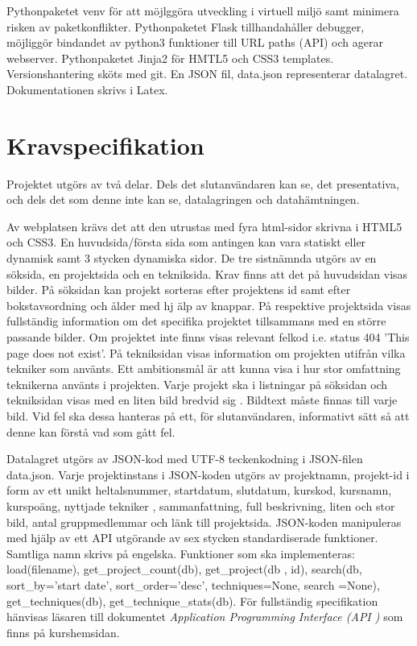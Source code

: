 \documentclass{TDP003mall}
\begin{document}
Pythonpaketet venv för att möjlggöra utveckling i virtuell miljö samt minimera risken av paketkonflikter.
Pythonpaketet Flask tillhandahåller debugger, möjliggör bindandet av python3 funktioner till URL paths (API) och agerar webserver.
Pythonpaketet Jinja2 för HMTL5 och CSS3 templates.
Versionshantering sköts med git.
En JSON fil, data.json representerar datalagret.
Dokumentationen skrivs i Latex.

\newpage

\section{Kravspecifikation}
Projektet utgörs av två delar. Dels det slutanvändaren kan se, det presentativa,
och dels det som denne inte kan se, datalagringen och datahämtningen.

Av webplatsen krävs det att den utrustas med fyra html-sidor skrivna i HTML5 och
 CSS3. En huvudsida/första sida som antingen kan vara statiskt eller dynamisk samt
 3 stycken dynamiska sidor. De tre sistnämnda utgörs av en söksida, en projektsida
 och en tekniksida. Krav finns att det på huvudsidan visas bilder. På söksidan kan
 projekt sorteras efter projektens id samt efter bokstavsordning och ålder med hj
älp av knappar. På respektive projektsida visas fullständig information om det specifika
 projektet tillsammans med en större passande bilder. Om projektet inte finns visas
 relevant felkod i.e. status 404 'This page does not exist'. På tekniksidan visas
 information om projekten utifrån vilka tekniker som använts. Ett ambitionsmål är
 att kunna visa i hur stor omfattning teknikerna använts i projekten. Varje projekt
 ska i listningar på söksidan och tekniksidan visas med en liten bild bredvid sig
. Bildtext måste finnas till varje bild. Vid fel ska dessa hanteras på ett, för 
slutanvändaren, informativt sätt så att denne kan förstå vad som gått fel.

Datalagret utgörs av JSON-kod med UTF-8 teckenkodning i JSON-filen data.json. Varje
 projektinstans i JSON-koden utgörs av projektnamn, projekt-id i form av ett unikt
 heltalsnummer, startdatum, slutdatum, kurskod, kursnamn, kurspoäng, nyttjade tekniker
, sammanfattning, full beskrivning, liten och stor bild, antal gruppmedlemmar och
 länk till projektsida. JSON-koden manipuleras med hjälp av ett API utgörande av
 sex stycken standardiserade funktioner. Samtliga namn skrivs på engelska. Funktioner
 som ska implementeras: load(filename), get\_project\_count(db), get\_project(db
, id), search(db, sort\_by='start date', sort\_order='desc', techniques=None, search
=None), get\_techniques(db), get\_technique\_stats(db). För fullständig specifikation
 hänvisas läsaren till dokumentet \textit{Application Programming Interface (API
)} som finns på kurshemsidan.
\end{document}

